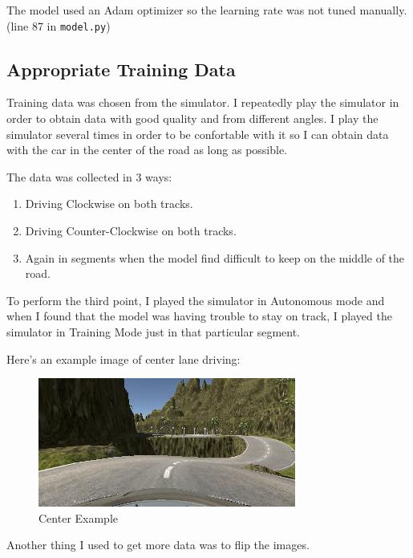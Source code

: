 \documentclass[11pt, a4paper]{article}
\begin{document}
The model used an Adam optimizer so the learning rate was not tuned manually. (line 87 in \texttt{model.py})




\subsection{Appropriate Training Data}%
\label{sub:appropiate_training_data}

Training data was chosen from the simulator. I repeatedly play the simulator in order to obtain data with good quality and from different angles. I play the simulator several times in order to be confortable with it so I can obtain data with the car in the center of the road as long as possible.


The data was collected in 3 ways:
\begin{enumerate}
	\item Driving Clockwise on both tracks.
	\item Driving Counter-Clockwise on both tracks.
	\item Again in segments when the model find difficult to keep on the middle of the road.
\end{enumerate}

To perform the third point, I played the simulator in Autonomous mode and when I found that the model was having trouble to stay on track, I played the simulator in Training Mode just in that particular segment.


Here's an example image of center lane driving:


\begin{figure}[htpb!]
	\centering
	\includegraphics[width=0.8\linewidth]{center_example}
	\caption{Center Example}
	\label{fig:center_example}
\end{figure}



Another thing I used to get more data was to flip the images. 
\end{document}
